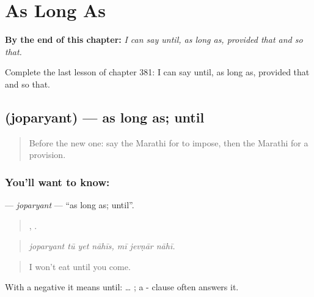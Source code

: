 
\chapter{As Long As}
\label{ch:mr-as-long-as}

\begin{chapteropening}
\textbf{By the end of this chapter:} \emph{I can say until, as long as, provided that and so that.}

Complete the last lesson of chapter 381: I can say until, as long as, provided that and so that.
\end{chapteropening}

\section[\texorpdfstring{\mr{जोपर्यंत} (joparyant)}{जोपर्यंत (joparyant)}]{ (joparyant) — as long as; until}

\label{lesson:MR-C381-joparyant}



\begin{quote}
Before the new one: say the Marathi for to impose, then the Marathi for a provision.
\end{quote}

\subsection*{You'll want to know: }
\textbf{} — \emph{joparyant} — \textquotedblleft{}as long as; until\textquotedblright{}.

\begin{quote}
   ,   .
\end{quote}

\begin{quote}
\emph{joparyant tū yet nāhīs, mī jevṇār nāhī.}
\end{quote}

\begin{quote}
I won't eat until you come.
\end{quote}

With a negative it means until:  … ; a - clause often answers it.

